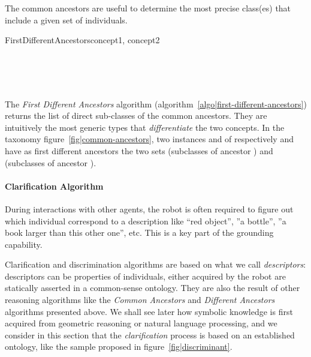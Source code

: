 The common ancestors are useful  to determine the most precise class(es) that
include a given set of individuals.

\small
\begin{pseudocode}[ruled]{FirstDifferentAncestors}{concept1, concept2}
\label{algo|first-different-ancestors}

\BEGIN
{} \GETS {} \\
 \GETS {} \cup {} \\

 \\
\END

\end{pseudocode}
\normalsize

The \emph{First Different Ancestors} algorithm
(algorithm~\ref{algo|first-different-ancestors}) returns the list of direct
sub-classes of the common ancestors. They are intuitively the most generic
types that \emph{differentiate} the two concepts. In the taxonomy
figure~\ref{fig|common-ancestors}, two instances  and  of
respectively  and  have as first different
ancestors the two sets  (subclasses of ancestor
) and  (subclasses of
ancestor ).

\paragraph{Clarification Algorithm}
\label{sect|clarify}

During interactions with other agents, the robot is often required to figure
out which individual correspond to a description like ``red object'', ''a
bottle'', ''a book larger than this other one'', etc. This is a key part of the
grounding capability.

Clarification and discrimination algorithms are based on what we call
\emph{descriptors}: descriptors can be properties of individuals, either
acquired by the robot are statically asserted in a common-sense ontology. They
are also the result of other reasoning algorithms like the \emph{Common
Ancestors} and \emph{Different Ancestors} algorithms presented above.
We shall see later how symbolic knowledge is first acquired from geometric
reasoning or natural language processing, and we consider in this section that
the \emph{clarification} process is based on an established ontology, like the
sample proposed in figure~\ref{fig|discriminant}.

